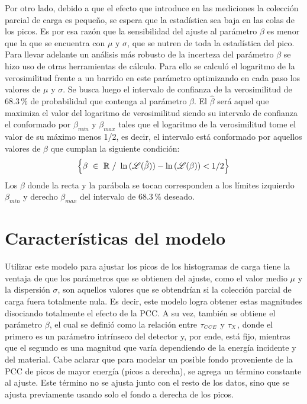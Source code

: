 Por otro lado, debido a que el efecto que introduce en las mediciones la colección parcial de carga es pequeño, se espera que la estadística sea baja en las colas de los picos. Es por esa razón que la sensibilidad del ajuste al parámetro $\beta$ es menor que la que se encuentra con $\mu$ y $\sigma$, que se nutren de toda la estadística del pico. Para llevar adelante un análisis más robusto de la incerteza del parámetro $\beta$ se hizo uso de otras herramientas de cálculo. Para ello se calculó el logaritmo de la verosimilitud frente a un barrido en este parámetro optimizando en cada paso los valores de $\mu$ y $\sigma$. Se busca luego el intervalo de confianza de la verosimilitud de $68.3\,\%$ de probabilidad que contenga al parámetro $\beta$. El $\hat{\beta}$ será aquel que maximiza el valor del logaritmo de verosimilitud siendo su intervalo de confianza el conformado por $\beta_{min}$ y $\beta_{max}$ tales que el logaritmo de la verosimilitud tome el valor de su máximo menos 1/2, es decir, el intervalo está conformado por aquellos valores de $\beta$ que cumplan la siguiente condición:
\begin{equation*}
    \left\{
        \beta\ \in\ \mathbb{R}\ /\ 
        \ln{(\Lagr(\hat{\beta}))}
        -
        \ln{
            \left(
                \Lagr(\beta)
            \right)
            }
        < 1/2
    \right\}
\end{equation*}
Los $\beta$ donde la recta y la parábola se tocan corresponden a los límites izquierdo $\beta_{min}$ y derecho $\beta_{max}$ del intervalo de $68.3\,\%$ deseado\cite{Frodesen}.


\section{Características del modelo}

\noindent Utilizar este modelo para ajustar los picos de los histogramas de carga tiene la ventaja de que los parámetros que se obtienen del ajuste, como el valor medio $\mu$ y la dispersión $\sigma$, son aquellos valores que se obtendrían si la colección parcial de carga fuera totalmente nula. Es decir, este modelo logra obtener estas magnitudes disociando totalmente el efecto de la PCC. A su vez, también se obtiene el parámetro $\beta$, el cual se definió como la relación entre $\tau_{\scaleto{CCE}{4pt}}$ y $\tau_{\scaleto{X}{4pt}}$, donde el primero es un parámetro intrínseco del detector y, por ende, está fijo, mientras que el segundo es una magnitud que varía dependiendo de la energía incidente y del material. Cabe aclarar que para modelar un posible fondo proveniente de la PCC de picos de mayor energía (picos a derecha), se agrega un término constante al ajuste. Este término no se ajusta junto con el resto de los datos, sino que se ajusta previamente usando solo el fondo a derecha de los picos.

